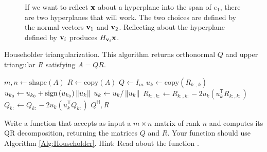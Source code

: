 \begin{figure}
\caption{If we want to reflect ${\bf x}$ about a hyperplane into the span of $e_1$, there are two hyperplanes that will work. 
The two choices are defined by the normal vectors ${\bf v}_1$ and ${\bf v}_2$. 
Reflecting about the hyperplane defined by ${\bf v}_i$ produces  $H_{{\bf v}_i}{\bf x}$.}
\label{fig:two reflectors}
\end{figure}

\begin{algorithm}
\caption{Householder triangularization. 
This algorithm returns orthonormal $Q$ and upper triangular $R$ satisfying $A = QR$.}
\label{Alg:Householder}
\begin{algorithmic}[1]
\State $m, n \gets \text{shape} \left( A \right)$
\State $R \gets \text{copy} \left( A \right)$
\State $Q \gets I_m$
    \State $u_k \gets \text{copy} \left( R_{k:,k} \right)$
    \State $u_{k_0} \gets u_{k_0} + \text{sign} \left( u_{k_0} \right) \left\lVert u_k\right\rVert$
    \State $u_k \gets u_k / \left\lVert u_k\right\rVert$
    \State $R_{k:,k:} \gets R_{k:,k:} - 2 u_k \left( u_k^\mathsf{T} R_{k:,k:} \right)$
    \State $Q_{k:} \gets Q_{k:} - 2 u_k \left( u_k^\mathsf{T} Q_{k:} \right)$
\EndFor
\State {} $Q^\mathsf{H}, R$
\EndProcedure
\end{algorithmic}
\end{algorithm}


\begin{problem}
\label{prob:HouseholderQR}
Write a function that accepts as input a $m \times n$ matrix of rank $n$ and computes its QR decomposition, returning the matrices $Q$ and $R$. 
Your function should use Algorithm \ref{Alg:Householder}. 
Hint: Read about the function .
\end{problem}

